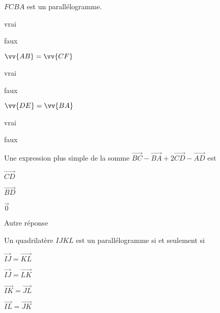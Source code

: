 \begin{QCM}
\begin{GroupeQCM}
\begin{exercice}$FCBA$ est un parallélogramme.
\begin{ChoixQCM}{2}
\item vrai
\item faux
\end{ChoixQCM}
\begin{corrige}
\end{corrige}
\end{exercice}


\begin{exercice}$\vv{AB}=\vv{CF}$
\begin{ChoixQCM}{2}
\item vrai
\item faux
\end{ChoixQCM}
\begin{corrige}
\end{corrige}
\end{exercice}

\begin{exercice}$\vv{DE}=\vv{BA}$
\begin{ChoixQCM}{2}
\item vrai
\item faux
\end{ChoixQCM}
\begin{corrige}
\end{corrige}
\end{exercice}

\begin{exercice}Une expression plus simple de la somme $\overrightarrow{BC}-\overrightarrow{BA}+2\overrightarrow{CD}-\overrightarrow{AD}$ est
\begin{ChoixQCM}{4}
\item $\overrightarrow{CD}$
\item $\overrightarrow{BD}$
\item $\overrightarrow{0}$
\item Autre réponse
\end{ChoixQCM}
\begin{corrige}
\end{corrige}
\end{exercice}

\begin{exercice}Un quadrilatère $IJKL$ est un parallélogramme si et seulement si
\begin{ChoixQCM}{4}
\item $\overrightarrow{IJ}=\overrightarrow{KL}$
\item $\overrightarrow{IJ}=\overrightarrow{LK}$
\item $\overrightarrow{IK}=\overrightarrow{JL}$
\item $\overrightarrow{IL}=\overrightarrow{JK}$
\end{ChoixQCM}
\begin{corrige}
\end{corrige}
\end{exercice}


\end{GroupeQCM}
\end{QCM}
